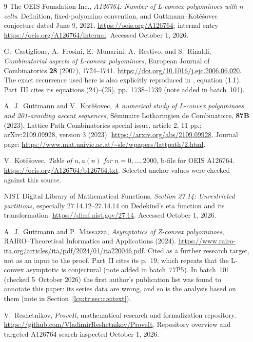 \documentclass[11pt]{article}
\numberwithin{equation}{section}
\theoremstyle{definition}\newtheorem{definition}[theorem]{Definition}
\theoremstyle{remark}\newtheorem{remark}[theorem]{Remark}
\begin{document}
\begingroup
\raggedright
\begin{thebibliography}{9}
The OEIS Foundation Inc., \emph{A126764: Number of L-convex polyominoes
with $n$ cells}. Definition, fixed-polyomino convention, and
Guttmann--Kot\v e\v sovec conjecture dated June 9, 2021.
\url{https://oeis.org/A126764}; internal entry
\url{https://oeis.org/A126764/internal}. Accessed October 1, 2026.

G.~Castiglione, A.~Frosini, E.~Munarini, A.~Restivo, and S.~Rinaldi,
\emph{Combinatorial aspects of L-convex polyominoes},
European Journal of Combinatorics \textbf{28} (2007), 1724--1741.
\url{https://doi.org/10.1016/j.ejc.2006.06.020}.
The exact recurrence used here is also explicitly reproduced in
\cite{gk}, equation (1.1).
Part~III cites its equations (24)--(25), pp.~1738--1739 (note added in
batch~101).

A.~J.~Guttmann and V.~Kot\v e\v sovec,
\emph{A numerical study of L-convex polyominoes and 201-avoiding
ascent sequences}, S\'eminaire Lotharingien de Combinatoire,
\textbf{87B} (2023), Lattice Path Combinatorics special issue, article 2, 11 pp.;
arXiv:2109.09928, version 3 (2023).
\url{https://arxiv.org/abs/2109.09928}.
Journal page: \url{https://www.mat.univie.ac.at/~slc/wpapers/lattpath/2.html}.

V.~Kot\v e\v sovec, \emph{Table of $n,a(n)$ for $n=0,\ldots,2000$},
b-file for OEIS A126764.
\url{https://oeis.org/A126764/b126764.txt}.
Selected anchor values were checked against this source.

NIST Digital Library of Mathematical Functions,
\emph{Section 27.14: Unrestricted partitions}, especially
27.14.12--27.14.14 on Dedekind's eta function and its transformation.
\url{https://dlmf.nist.gov/27.14}. Accessed October 1, 2026.

A.~J.~Guttmann and P.~Massazza,
\emph{Asymptotics of Z-convex polyominoes},
RAIRO--Theoretical Informatics and Applications (2024).
\url{https://www.rairo-ita.org/articles/ita/pdf/2024/01/ita220046.pdf}.
Cited as a further research target, not as an input to the proof.
Part~II cites its p.~19, which repeats that the L-convex asymptotic is
conjectural (note added in batch~77P5).
In batch~101 (checked 5~October 2026) the first author's publication
list was found to annotate this paper: its series data are wrong, and so
is the analysis based on them (note in Section~\ref{lcp:tr:sec:context}).

V.~Reshetnikov, \emph{ProveIt}, mathematical research and formalization
repository. \url{https://github.com/VladimirReshetnikov/ProveIt}.
Repository overview and targeted A126764 search inspected October 1, 2026.


\end{thebibliography}
\end{document}
